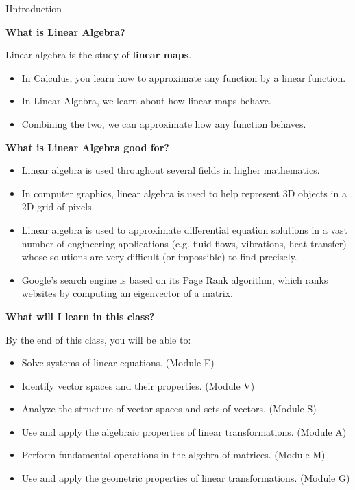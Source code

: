 
\begin{module}{I}{Introduction}
\begin{applicationActivities}{0}{0}

\begin{remark} \textbf{What is Linear Algebra?}

  Linear algebra is the study of \textbf{linear maps}.

  \begin{itemize}
  \item In Calculus, you learn how to approximate any function by a
        linear function.
  \item In Linear Algebra, we learn about how linear maps behave.
  \item Combining the two, we can approximate how any function behaves.
  \end{itemize}
\end{remark}

\begin{remark} \textbf{What is Linear Algebra good for?}
  \begin{itemize}
  \item Linear algebra is used throughout several fields
        in higher mathematics.
  \item In computer graphics, linear algebra is used to help represent
        3D objects in a 2D grid of pixels.
  \item Linear algebra is used to approximate
        differential equation solutions in a vast number of engineering
        applications (e.g. fluid flows, vibrations, heat transfer) whose
        solutions are very difficult (or impossible) to find precisely.
  \item Google's search engine is based on its Page Rank algorithm, which
        ranks websites by computing an eigenvector of a matrix.
  \end{itemize}
\end{remark}

\begin{remark} \textbf{What will I learn in this class?}

  By the end of this class, you will be able to:
  \begin{itemize}
  \item Solve systems of linear equations.
        (Module E)
  \item Identify vector spaces and their properties.
        (Module V)
  \item Analyze the structure of vector spaces and sets of vectors.
        (Module S)
  \item Use and apply the algebraic properties of linear transformations.
        (Module A)
  \item Perform fundamental operations in the algebra of matrices.
        (Module M)
  \item Use and apply the geometric properties of linear transformations.
        (Module G)
  \end{itemize}
\end{remark}

\end{applicationActivities}
\end{module}
